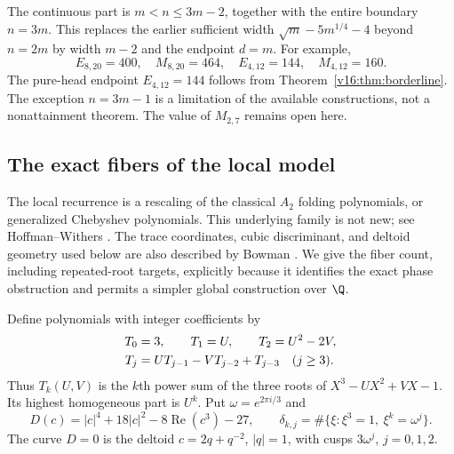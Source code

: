 \documentclass[UTF8,11pt]{ctexart}
\theoremstyle{definition}
\numberwithin{equation}{section}
\DeclareMathOperator{\Rea}{Re}\DeclareMathOperator{\Ima}{Im}
\begin{document}
The continuous part is $m<n\le3m-2$, together with the entire boundary
$n=3m$. This replaces the earlier sufficient width
$\sqrt m-5m^{1/4}-4$ beyond $n=2m$ by width $m-2$ and the endpoint
$d=m$. For example,
\[
 E_{8,20}=400,\quad M_{8,20}=464,\quad
 E_{4,12}=144,\quad M_{4,12}=160.
\]
The pure-head endpoint $E_{4,12}=144$ follows from
Theorem~\ref{v16:thm:borderline}.
The exception $n=3m-1$ is a limitation of the available constructions,
not a nonattainment theorem. The value of $M_{2,7}$ remains open here.

\subsection{The exact fibers of the local model}
\label{v5:sec:fibers}

The local recurrence is a rescaling of the classical $A_2$ folding
polynomials, or generalized Chebyshev polynomials. This underlying
family is not new; see Hoffman--Withers \cite{HW88}. The trace
coordinates, cubic discriminant, and deltoid geometry used below are
also described by Bowman \cite[Sections~3--4, pp.~3--6]{Bow20}.
We give the fiber count, including repeated-root targets, explicitly
because it identifies the exact phase obstruction and permits a
simpler global construction over $\Q$.

Define polynomials with integer coefficients by
\begin{align}
 T_0&=3,\qquad T_1=U,\qquad T_2=U^2-2V,\notag\\
 T_j&=UT_{j-1}-VT_{j-2}+T_{j-3}\quad(j\ge3).
                                      \label{v5:eq:canonical}
\end{align}
Thus $T_k(U,V)$ is the $k$th power sum of the three roots of
$X^3-UX^2+VX-1$. Its highest homogeneous part is $U^k$.
Put $\omega=e^{2\pi i/3}$ and
\begin{equation}\label{v5:eq:discriminant}
 D(c)=|c|^4+18|c|^2-8\Rea(c^3)-27,\qquad
 \delta_{k,j}=\#\{\xi:\xi^3=1,\ \xi^k=\omega^j\}.
\end{equation}
The curve $D=0$ is the deltoid $c=2q+q^{-2}$, $|q|=1$,
with cusps $3\omega^j$, $j=0,1,2$.
\end{document}

